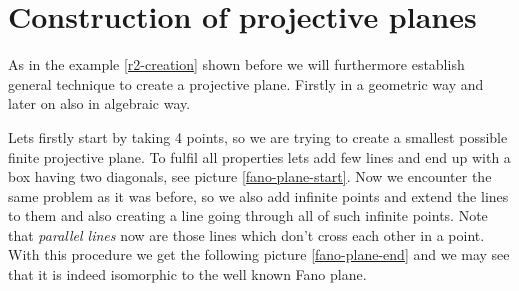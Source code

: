 \section{Construction of projective planes}

As in the example \ref{r2-creation} shown before we will furthermore establish general technique to create a projective plane. Firstly in a geometric way and later on also in algebraic way.

Lets firstly start by taking 4 points, so we are trying to create a smallest possible finite projective plane. To fulfil all properties lets add few lines and end up with a box having two diagonals, see picture \ref{fano-plane-start}. Now we encounter the same problem as it was before, so we also add infinite points and extend the lines to them and also creating a line going through all of such infinite points. Note that \textit{parallel lines} now are those lines which don't cross each other in a point. With this procedure we get the following picture \ref{fano-plane-end} and we may see that it is indeed isomorphic to the well known Fano plane.


